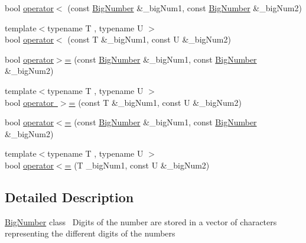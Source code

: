 \textbf{ }\par
\begin{DoxyCompactItemize}
\item 
bool \mbox{\hyperlink{class_big_nums_1_1_big_number_a5908b93d7477c482d145b878fa003101}{operator$<$}} (const \mbox{\hyperlink{class_big_nums_1_1_big_number}{Big\+Number}} \&\+\_\+big\+Num1, const \mbox{\hyperlink{class_big_nums_1_1_big_number}{Big\+Number}} \&\+\_\+big\+Num2)
\item 
{\footnotesize template$<$typename T , typename U $>$ }\\bool \mbox{\hyperlink{class_big_nums_1_1_big_number_a8d081ba4f8cf93e90d74dbe013695b1c}{operator$<$}} (const T \&\+\_\+big\+Num1, const U \&\+\_\+big\+Num2)
\end{DoxyCompactItemize}

\textbf{ }\par
\begin{DoxyCompactItemize}
\item 
bool \mbox{\hyperlink{class_big_nums_1_1_big_number_aa64caabb2b7a6a9bc6fc28e1abf961e3}{operator$>$=}} (const \mbox{\hyperlink{class_big_nums_1_1_big_number}{Big\+Number}} \&\+\_\+big\+Num1, const \mbox{\hyperlink{class_big_nums_1_1_big_number}{Big\+Number}} \&\+\_\+big\+Num2)
\item 
{\footnotesize template$<$typename T , typename U $>$ }\\bool \mbox{\hyperlink{class_big_nums_1_1_big_number_a7d9aa0ee821fabd568fad397d4274bc8}{operator $>$=}} (const T \&\+\_\+big\+Num1, const U \&\+\_\+big\+Num2)
\end{DoxyCompactItemize}

\textbf{ }\par
\begin{DoxyCompactItemize}
\item 
bool \mbox{\hyperlink{class_big_nums_1_1_big_number_a787ad7c1ee1b244a545034fbe1e09431}{operator$<$=}} (const \mbox{\hyperlink{class_big_nums_1_1_big_number}{Big\+Number}} \&\+\_\+big\+Num1, const \mbox{\hyperlink{class_big_nums_1_1_big_number}{Big\+Number}} \&\+\_\+big\+Num2)
\item 
{\footnotesize template$<$typename T , typename U $>$ }\\bool \mbox{\hyperlink{class_big_nums_1_1_big_number_a05bfb6df81cae921364aec33df340215}{operator$<$=}} (T \+\_\+big\+Num1, const U \&\+\_\+big\+Num2)
\end{DoxyCompactItemize}



\subsection{Detailed Description}
\mbox{\hyperlink{class_big_nums_1_1_big_number}{Big\+Number}} class~\newline
Digits of the number are stored in a vector of characters~\newline
representing the different digits of the numbers 

